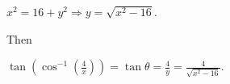 \documentclass[nooutcomes]{ximera}
\begin{document}
\begin{problem}
\begin{enumerate}
\begin{freeResponse}
			$x^2 = 16 + y^2 \Longrightarrow y = \sqrt{x^2 - 16}$.
			
			Then
			
			$ \tan \left( \cos^{-1} \left( \frac{4}{x} \right) \right) = \tan \theta = \frac{4}{y} = \frac{4}{\sqrt{x^2 - 16}}  $.
			 \end{freeResponse}
			
			\end{enumerate}
			
\end{problem}
			
			
			

	










								
				
				
	
\end{document}
